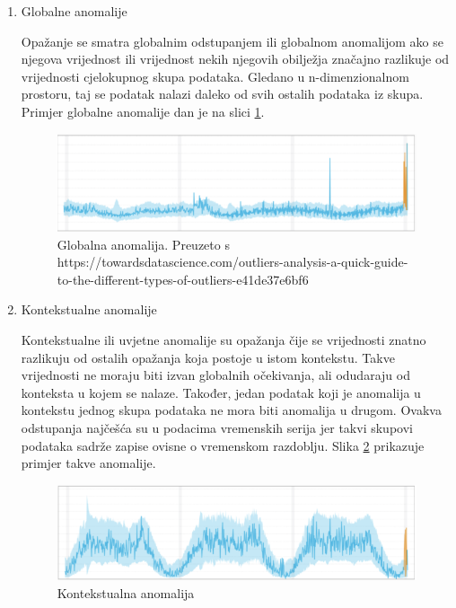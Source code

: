 \documentclass[utf8, diplomski, numeric]{fer}
\begin{document}
\begin{enumerate}
\item Globalne anomalije

Opažanje se smatra globalnim odstupanjem ili globalnom anomalijom ako se njegova vrijednost ili vrijednost nekih njegovih obilježja značajno razlikuje od vrijednosti cjelokupnog skupa podataka. Gledano u n-dimenzionalnom prostoru, taj se podatak nalazi daleko od svih ostalih podataka iz skupa. Primjer globalne anomalije dan je na slici \ref{fig:outlier1}.

\begin{figure}[htb]
\includegraphics[width=1\textwidth]{images/outlier_type1.png}
\centering
\caption{Globalna anomalija. Preuzeto s  https://towardsdatascience.com/outliers-analysis-a-quick-guide-to-the-different-types-of-outliers-e41de37e6bf6}
\label{fig:outlier1}
\end{figure}

\item Kontekstualne anomalije

Kontekstualne ili uvjetne anomalije su opažanja čije se vrijednosti znatno razlikuju od ostalih opažanja koja postoje u istom kontekstu. Takve vrijednosti ne moraju biti izvan globalnih očekivanja, ali odudaraju od konteksta u kojem se nalaze. Također, jedan podatak koji je anomalija u kontekstu jednog skupa podataka ne mora biti anomalija u drugom. Ovakva odstupanja najčešća su u podacima vremenskih serija jer takvi skupovi podataka sadrže zapise ovisne o vremenskom razdoblju. Slika \ref{fig:outlier2} prikazuje primjer takve anomalije.

\begin{figure}[htb]
\includegraphics[width=1\textwidth]{images/outlier_type2.png}
\centering
\caption{Kontekstualna anomalija}
\label{fig:outlier2}
\end{figure}


\end{enumerate}
\end{document}
